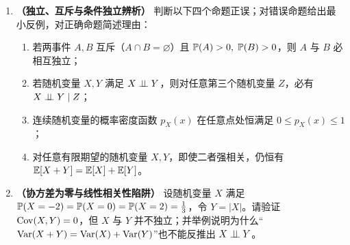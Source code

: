 
\begin{enumerate}[label=\textbf{1.\arabic*}, leftmargin=2.4em]
  \item \textbf{（独立、互斥与条件独立辨析）} 判断以下四个命题正误；对错误命题给出最小反例，对正确命题简述理由：
  \begin{enumerate}[label=(\alph*), leftmargin=1.8em]
    \item 若两事件 $A, B$ 互斥（$A\cap B = \varnothing$）且 $\mathbb{P}(A)>0,\; \mathbb{P}(B)>0$，则 $A$ 与 $B$ 必相互独立；
    \item 若随机变量 $X, Y$ 满足 $X \perp\!\!\!\perp Y$，则对任意第三个随机变量 $Z$，必有 $X \perp\!\!\!\perp Y \mid Z$；
    \item 连续随机变量的概率密度函数 $p_X(x)$ 在任意点处恒满足 $0 \le p_X(x) \le 1$；
    \item 对任意有限期望的随机变量 $X, Y$，即使二者强相关，仍恒有 $\mathbb{E}[X + Y] = \mathbb{E}[X] + \mathbb{E}[Y]$。
  \end{enumerate}

  \item \textbf{（协方差为零与线性相关性陷阱）} 设随机变量 $X$ 满足 $\mathbb{P}(X=-2)=\mathbb{P}(X=0)=\mathbb{P}(X=2)=\frac{1}{3}$，令 $Y = |X|$。请验证 $\operatorname{Cov}(X, Y) = 0$，但 $X$ 与 $Y$ 并不独立；并举例说明为什么“$\operatorname{Var}(X+Y) = \operatorname{Var}(X) + \operatorname{Var}(Y)$”也不能反推出 $X \perp\!\!\!\perp Y$。
\end{enumerate}


